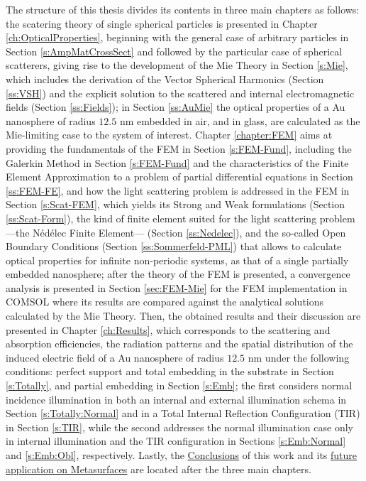 The structure of this thesis divides its contents in three main chapters as follows: the scatering theory of single spherical particles is presented in Chapter \ref{ch:OpticalProperties}, beginning with the general case of arbitrary particles in Section \ref{s:AmpMatCrossSect} and followed by the particular case of spherical scatterers,  giving rise to the development of the Mie Theory in Section \ref{s:Mie}, which includes the derivation of the Vector Spherical Harmonics (Section \ref{ss:VSH}) and the explicit solution to the scattered and internal electromagnetic fields (Section \ref{ss:Fields}); in Section \ref{ss:AuMie} the optical properties of a Au nanosphere of radius $12.5$ nm embedded in air, and in glass, are calculated as the Mie-limiting case to the system of interest. Chapter \ref{chapter:FEM} aims at providing the fundamentals of the FEM in Section \ref{s:FEM-Fund}, including the Galerkin Method in Section \ref{s:FEM-Fund} and the characteristics of the Finite Element Approximation to a problem of partial differential equations in Section \ref{ss:FEM-FE}, and how the light scattering problem is addressed in the FEM in Section \ref{s:Scat-FEM}, which yields its Strong and Weak formulations (Section \ref{ss:Scat-Form}), the kind of finite element suited for the light scattering problem ---the Nédélec Finite Element--- (Section  \ref{ss:Nedelec}), and the so-called Open Boundary Conditions (Section  \ref{ss:Sommerfeld-PML}) that allows to calculate optical properties for infinite non-periodic  systems, as that of a single partially embedded nanosphere; after the theory of the FEM is presented, a convergence analysis is presented in Section \ref{sec:FEM-Mie} for the FEM implementation in COMSOL where its results are compared against the analytical solutions calculated by the Mie Theory. Then, the obtained results and their discussion are presented in Chapter \ref{ch:Results}, which corresponds to the scattering and absorption efficiencies, the radiation patterns and the spatial distribution of the induced electric field of a Au nanosphere of radius $12.5$ nm under the following conditions: perfect support and total embedding in the substrate in Section \ref{s:Totally}, and partial embedding in Section \ref{s:Emb}; the first considers normal incidence illumination in both an internal and external illumination schema in Section \ref{s:Totally:Normal} and in a Total Internal Reflection Configuration (TIR) in Section \ref{s:TIR}, while the second addresses the normal illumination case only in internal illumination and the TIR configuration in Sections \ref{s:Emb:Normal} and \ref{s:Emb:Obl}, respectively. Lastly, the \hyperref[ch:Conclusions]{Conclusions} of this work and its \hyperref[s:FWork]{future application on Metasurfaces} are located after the three main chapters.	


